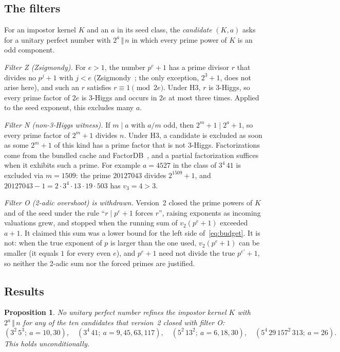 \documentclass[11pt]{amsart}
\theoremstyle{plain}
\newtheorem{proposition}[theorem]{Proposition}
\theoremstyle{definition}
\begin{document}
\subsection{The filters}
For an impostor kernel $K$ and an $a$ in its seed class, the \emph{candidate}
$(K,a)$ asks for a unitary perfect number with $2^a\,\Vert\, n$ in which every
prime power of $K$ is an odd component.

\emph{Filter Z (Zsigmondy).}  For $e>1$, the number $p^e+1$ has a prime
divisor $r$ that divides no $p^j+1$ with $j<e$ (Zsigmondy~\cite{Zsigmondy}; the
only exception, $2^3+1$, does not arise here), and such an $r$ satisfies
$r\equiv1\pmod{2e}$.  Under H3, $r$ is 3-Higgs,
so every prime factor of $2e$ is 3-Higgs and occurs in $2e$ at most three times.
Applied to the seed exponent, this excludes many $a$.

\emph{Filter N (non-3-Higgs witness).}  If $m\mid a$ with $a/m$ odd, then
$2^m+1\mid 2^a+1$, so every prime factor of $2^m+1$ divides $n$.  Under H3, a
candidate is excluded as soon as some $2^m+1$ of this kind has a prime factor
that is not 3-Higgs.  Factorizations come from the bundled cache and
FactorDB~\cite{FactorDB}, and a partial factorization suffices when it exhibits
such a prime.  For example $a=4527$ in the class of $3^4\,41$ is excluded via
$m=1509$: the prime $20127043$ divides $2^{1509}+1$, and
$20127043-1=2\cdot3^4\cdot13\cdot19\cdot503$ has $v_3=4>3$.

\emph{Filter O (2-adic overshoot) is withdrawn.}  Version~2 closed the prime
powers of $K$ and of the seed under the rule ``$r\mid p^e+1$ forces $r$'', raising
exponents as incoming valuations grew, and stopped when the running sum of
$v_2(p^e+1)$ exceeded $a+1$.  It claimed this sum was a lower bound for the
left side of~\eqref{eq:budget}.  It is not: when the true exponent of $p$ is
larger than the one used, $v_2(p^e+1)$ can be smaller (it equals $1$ for every
even $e$), and $p^e+1$ need not divide the true $p^{e'}+1$, so neither the 2-adic
sum nor the forced primes are justified.

\subsection{Results}

\begin{proposition}\label{prop:ten}
No unitary perfect number refines the impostor kernel $K$ with $2^a\,\Vert\, n$
for any of the ten candidates that version~2 closed with filter O:
\[
(3^2\,5^3;\ a=10,30),\quad (3^4\,41;\ a=9,45,63,117),\quad
(5^2\,13^2;\ a=6,18,30),\quad (5^4\,29\,157^2\,313;\ a=26).
\]
This holds unconditionally.
\end{proposition}
\end{document}
